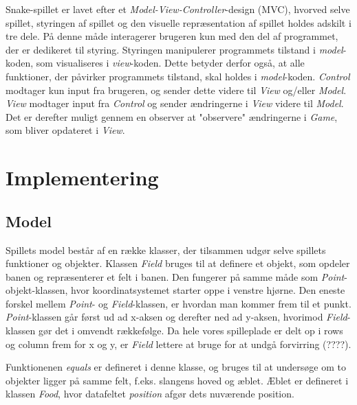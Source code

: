 \documentclass{report}
\begin{document}
Snake-spillet er lavet efter et \textit{Model-View-Controller}-design (MVC), hvorved selve spillet, styringen af spillet og den visuelle repræsentation af spillet holdes adskilt i tre dele. På denne måde interagerer brugeren kun med den del af programmet, der er dedikeret til styring. Styringen manipulerer programmets tilstand i \textit{model}-koden, som visualiseres i \textit{view}-koden. Dette betyder derfor også, at alle funktioner, der påvirker programmets tilstand, skal holdes i \textit{model}-koden. \textit{Control} modtager kun input fra brugeren, og sender dette videre til \textit{View} og/eller \textit{Model}. \textit{View} modtager input fra \textit{Control} og sender ændringerne i \textit{View} videre til \textit{Model}. Det er derefter muligt gennem en observer at "observere" ændringerne i \textit{Game}, som bliver opdateret i \textit{View}.

\section{Implementering}

\subsection{Model}
Spillets model består af en række klasser, der tilsammen udgør selve spillets funktioner og objekter.
Klassen \textit{Field} bruges til at definere et objekt, som opdeler banen og repræsenterer et felt i banen. Den fungerer på samme måde som \textit{Point}-objekt-klassen, hvor koordinatsystemet starter oppe i venstre hjørne. Den eneste forskel mellem \textit{Point}- og \textit{Field}-klassen, er hvordan man kommer frem til et punkt. \textit{Point}-klassen går først ud ad x-aksen og derefter ned ad y-aksen, hvorimod \textit{Field}-klassen gør det i omvendt rækkefølge. Da hele vores spilleplade er delt op i rows og column frem for x og y, er \textit{Field} lettere at bruge for at undgå forvirring (????).
\linebreak

Funktionenen \textit{equals} er defineret i denne klasse, og bruges til at undersøge om to objekter ligger på samme felt, f.eks. slangens hoved og æblet. Æblet er defineret i klassen \textit{Food}, hvor datafeltet \textit{position} afgør dets nuværende position. 
\end{document}
